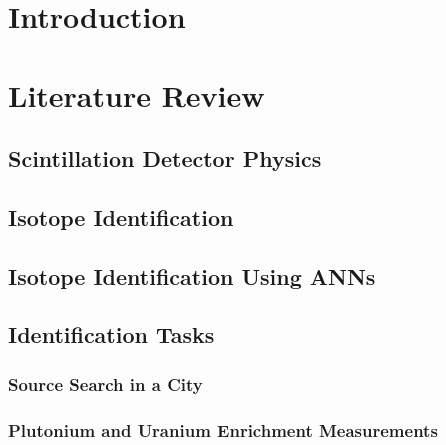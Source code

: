 \documentclass[thesis,tocnosub,noragright,centerchapter,12pt,fullpage]{uiucecethesis09}
\begin{document}
%

%




\tableofcontents



\chapter{Introduction}











\chapter{Literature Review}


\section{Scintillation Detector Physics}




\section{Isotope Identification}




\section{Isotope Identification Using ANNs}




\section{Identification Tasks}

\subsection{Source Search in a City}


\subsection{Plutonium and Uranium Enrichment Measurements}
\end{document}
